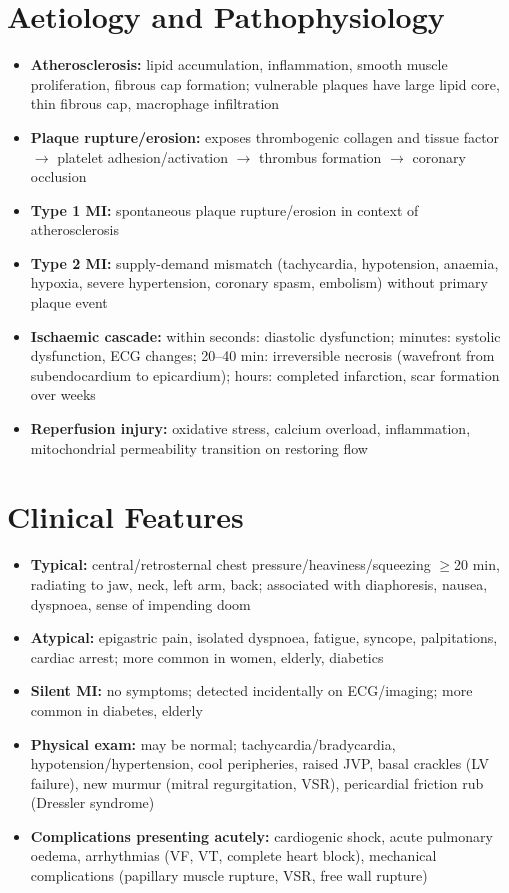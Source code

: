 \section*{Aetiology and Pathophysiology}
\begin{itemize}
    \item \textbf{Atherosclerosis:} lipid accumulation, inflammation, smooth muscle proliferation, fibrous cap formation; vulnerable plaques have large lipid core, thin fibrous cap, macrophage infiltration
    \item \textbf{Plaque rupture/erosion:} exposes thrombogenic collagen and tissue factor $\to$ platelet adhesion/activation $\to$ thrombus formation $\to$ coronary occlusion
    \item \textbf{Type 1 MI:} spontaneous plaque rupture/erosion in context of atherosclerosis
    \item \textbf{Type 2 MI:} supply-demand mismatch (tachycardia, hypotension, anaemia, hypoxia, severe hypertension, coronary spasm, embolism) without primary plaque event
    \item \textbf{Ischaemic cascade:} within seconds: diastolic dysfunction; minutes: systolic dysfunction, ECG changes; 20--40 min: irreversible necrosis (wavefront from subendocardium to epicardium); hours: completed infarction, scar formation over weeks
    \item \textbf{Reperfusion injury:} oxidative stress, calcium overload, inflammation, mitochondrial permeability transition on restoring flow
\end{itemize}

\section*{Clinical Features}
\begin{itemize}
    \item \textbf{Typical:} central/retrosternal chest pressure/heaviness/squeezing $\ge$20 min, radiating to jaw, neck, left arm, back; associated with diaphoresis, nausea, dyspnoea, sense of impending doom
    \item \textbf{Atypical:} epigastric pain, isolated dyspnoea, fatigue, syncope, palpitations, cardiac arrest; more common in women, elderly, diabetics
    \item \textbf{Silent MI:} no symptoms; detected incidentally on ECG/imaging; more common in diabetes, elderly
    \item \textbf{Physical exam:} may be normal; tachycardia/bradycardia, hypotension/hypertension, cool peripheries, raised JVP, basal crackles (LV failure), new murmur (mitral regurgitation, VSR), pericardial friction rub (Dressler syndrome)
    \item \textbf{Complications presenting acutely:} cardiogenic shock, acute pulmonary oedema, arrhythmias (VF, VT, complete heart block), mechanical complications (papillary muscle rupture, VSR, free wall rupture)
\end{itemize}

